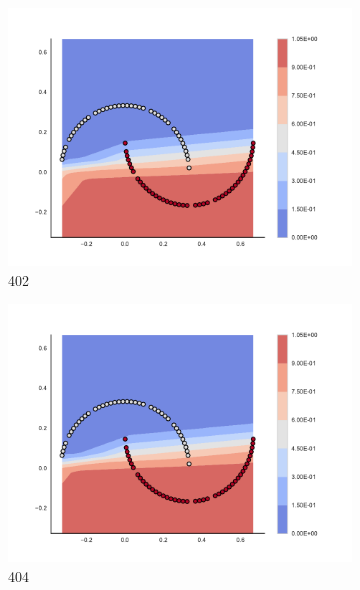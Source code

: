 \begin{figure}[h]
\begin{subfigure}[b]{0.09\textwidth}
    \includegraphics[clip, trim=2.35cm 1.75cm 4.5cm 0cm,width=\textwidth]{img/convergence/402.pdf}
    \caption{402}
    \label{fig:convergence_402}
\end{subfigure}
%
\begin{subfigure}[b]{0.09\textwidth}
    \includegraphics[clip, trim=2.35cm 1.75cm 4.5cm 0cm,width=\textwidth]{img/convergence/404.pdf}
    \caption{404}
    \label{fig:convergence_404}
\end{subfigure}
%
\begin{subfigure}[b]{0.09\textwidth}

\end{subfigure}
\end{figure}
